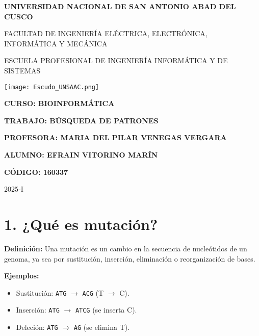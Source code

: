 \documentclass[fleqn,10pt]{article}
\begin{document}
\begin{titlepage}
    \centering
    \vspace*{1cm}
    {\LARGE\bfseries UNIVERSIDAD NACIONAL DE SAN ANTONIO ABAD DEL CUSCO\par}
    \vspace{0.5cm}
    {\Large FACULTAD DE INGENIERÍA ELÉCTRICA, ELECTRÓNICA, INFORMÁTICA Y MECÁNICA\par}
    \vspace{0.5cm}
    {\Large ESCUELA PROFESIONAL DE INGENIERÍA INFORMÁTICA Y DE SISTEMAS\par}
    \vfill
    \texttt{[image: Escudo\_UNSAAC.png]}\par
    \vfill
    {\Large\bfseries CURSO: BIOINFORMÁTICA\par}
    \vspace{0.3cm}
    {\Large\bfseries TRABAJO: BÚSQUEDA DE PATRONES\par}
    \vspace{0.3cm}
    {\Large\bfseries PROFESORA: MARIA DEL PILAR VENEGAS VERGARA\par}
    \vspace{1cm}
    {\Large\bfseries ALUMNO: EFRAIN VITORINO MARÍN\par}
    {\Large\bfseries CÓDIGO: 160337\par}
    \vfill
    {\Large 2025‑I\par}
\end{titlepage}

\setcounter{page}{1}
\pagestyle{plain}

\section*{1. ¿Qué es mutación?}
\textbf{Definición:}  
Una mutación es un cambio en la secuencia de nucleótidos de un genoma, ya sea por sustitución, inserción, eliminación o reorganización de bases.

\bigskip
\textbf{Ejemplos:}
\begin{itemize}
    \item Sustitución: \texttt{ATG} \(\to\) \texttt{ACG} (T \(\to\) C).
    \item Inserción:    \texttt{ATG} \(\to\) \texttt{ATCG} (se inserta C).
    \item Deleción:     \texttt{ATG} \(\to\) \texttt{AG}  (se elimina T).
\end{itemize}
\end{document}
